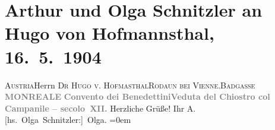 

         
         \renewcommand{\erwaehntePersonen}{Personen: Hugo von Hofmannsthal}
         \renewcommand{\erwaehnteOrte}{Orte: Badgasse, Castellaccio di Monreale, Monreale, Palermo, Rodaun, Österreich}
         \renewcommand{\erwaehnteWerke}{}
               \section[Arthur und Olga Schnitzler an Hugo von Hofmannsthal, 16. 5. 1904]{ Arthur und Olga Schnitzler an Hugo von Hofmannsthal,
               16. 5. 1904}\nopagebreak{}\rehead{ }\begin{ledgroupsized}[t]{13cm}\normalsize\beginnumbering \toendnotes[C]{\smallbreak\pagebreak[2]} 
\pstart{}{\pb}\textsc{Austria}\pend{}\pstart{}Herrn \textsc{Dr Hugo v. Hofma{\geminationn}sthal}\pend{}\pstart{}\textsc{Rodaun bei Vienne.}\pend{}\pstart{}\textsc{Badgasse}\pend{}{\bigskip}\pstart
           \noindent{}\centering{}\textcolor{gray}{\textbf{{\pb}MONREALE}}\pend
           \pstart
           \noindent{}\centering{}\textcolor{gray}{\textbf{Convento dei Benedettini\hspace*{1em}Veduta del Chiostro col Campanile –
                     secolo XII.}}\pend
           \pstart
           Herzliche Grüße!\pend
           \pstart
           Ihr \spacefill\mbox{A.}{\\[\baselineskip]}\spacefill\mbox{{[}hs. Olga Schnitzler:{]} Olga.}\pend
           \leftskip=0em{}
         
         \endnumbering{}\end{ledgroupsized}  \newcommand{\dateiname}{L01401}\newcommand{\titel}{Arthur und Olga Schnitzler an Hugo von Hofmannsthal, 16. 5. 1904}\newcommand{\editorInnen}{Martin Anton Müller und Gerd-Hermann Susen}
      